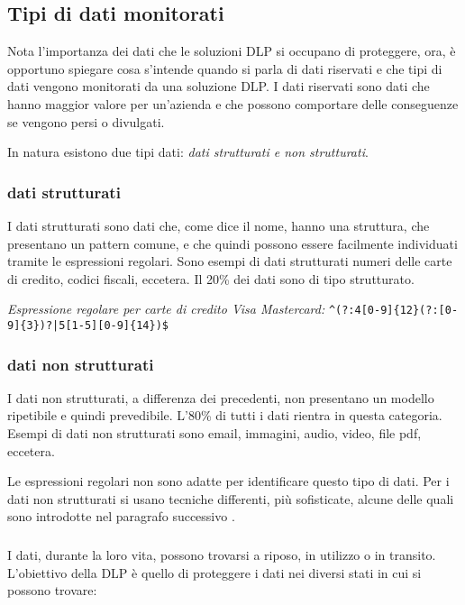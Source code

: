 \subsection{Tipi di dati monitorati}
    Nota l'importanza dei dati che le soluzioni DLP si occupano di proteggere,
    ora, è opportuno spiegare cosa s'intende quando si parla di dati riservati e che tipi di dati vengono monitorati 
    da una soluzione DLP. I dati riservati sono dati che hanno maggior valore per un'azienda e che possono comportare 
    delle conseguenze se vengono persi o divulgati.

    In natura esistono due tipi dati: \textit{dati strutturati e non strutturati}.
        \subsubsection{dati strutturati}
            I dati strutturati sono dati che, come dice il nome, hanno una struttura, che presentano un pattern comune, e che 
            quindi possono essere facilmente individuati tramite le espressioni regolari. 
            Sono esempi di dati strutturati numeri delle carte di credito, codici fiscali, eccetera.
            Il 20\% dei dati sono di tipo strutturato. 
    
            \begin{center} 
                \textit{Espressione regolare per carte di credito Visa Mastercard:}
                \verb/^(?:4[0-9]{12}(?:[0-9]{3})?|5[1-5][0-9]{14})$/ 
            \end{center}

        \subsubsection{dati non strutturati}
            I dati non strutturati, a differenza dei precedenti, non presentano un modello ripetibile
            e quindi prevedibile. L'80\% di tutti i dati rientra in questa categoria. Esempi di dati non 
            strutturati sono email, immagini, audio, video, file pdf, eccetera. 
    
    Le espressioni regolari non sono adatte per identificare questo tipo di dati. %
    Per i dati non strutturati si usano tecniche differenti, più sofisticate, alcune delle quali sono introdotte nel paragrafo successivo \cite{DLP3}.

    \subsubsection*{}
    I dati, durante la loro vita, possono trovarsi a riposo, in utilizzo o in transito.
    L'obiettivo della DLP è quello di proteggere i dati nei diversi stati in cui si possono trovare:
    \cite{DLP1}

